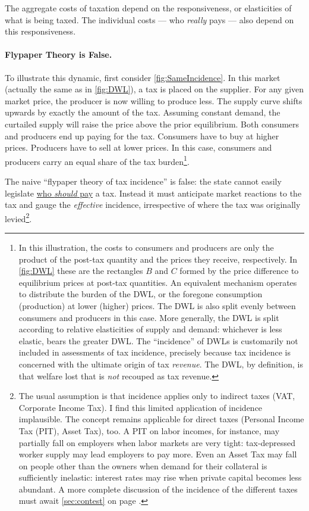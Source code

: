  The aggregate costs of taxation depend on the responsiveness, or elasticities of what is being taxed. The individual costs --- who \emph{really} pays --- also depend on this responsiveness.

\paragraph{Flypaper Theory is False.} To illustrate this dynamic, first consider \autoref{fig:SameIncidence}. In this market (actually the same as in \autoref{fig:DWL}), a tax is placed on the supplier. For any given market price, the producer is now willing to produce less. The supply curve shifts upwards by exactly the amount of the tax. Assuming constant demand, the curtailed supply will raise the price above the prior equilibrium. Both consumers and producers end up paying for the tax. Consumers have to buy at higher prices. Producers have to sell at lower prices. In this case, consumers and producers carry an equal share of the tax burden\footnote{
	In this illustration, the costs to consumers and producers are only the product of the post-tax quantity and the prices they receive, respectively. In \autoref{fig:DWL} these are the rectangles $B$ and $C$ formed by the price difference to equilibrium prices at post-tax quantities. An equivalent mechanism operates to distribute the burden of the DWL, or the foregone consumption (production) at lower (higher) prices. The DWL is also split evenly between consumers and producers in this case. More generally, the DWL is split according to relative elasticities of supply and demand: whichever is less elastic, bears the greater DWL.  The ``incidence'' of DWLs is customarily not included in assessments of tax incidence, precisely because tax incidence is concerned with the ultimate origin of tax \emph{revenue}. The DWL, by definition, is that welfare lost that is \emph{not} recouped as tax revenue.}.


The naive ``flypaper theory of tax incidence'' is false: the state cannot easily legislate \href{sec:RedistributionIsPersonal}{who \emph{should} pay} a tax. Instead it must anticipate market reactions to the tax and gauge the \emph{effective} incidence, irrespective of where the tax was originally levied\footnote{
	The usual assumption is that incidence applies only to indirect taxes (VAT, Corporate Income Tax). I find this limited application of incidence implausible. The concept remains applicable for direct taxes (Personal Income Tax (PIT), Asset Tax), too. A PIT on labor incomes, for instance, may partially fall on employers when labor markets are very tight: tax-depressed worker supply may lead employers to pay more. Even an Asset Tax may fall on people other than the owners when demand for their collateral is sufficiently inelastic: interest rates may rise when private capital becomes less abundant. A more complete discussion of the incidence of the different taxes must await \autoref{sec:contest} on page \pageref{sec:contest}.}.

